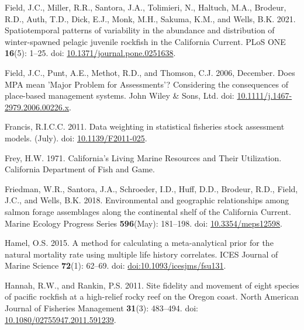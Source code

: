 \documentclass[11pt,
  english,
  a4paper,
]{article}
\newlength{\cslhangindent}
\newenvironment{CSLReferences}[2] %
 {%
  \setlength{\parindent}{0pt}
  \ifodd #1 \everypar{\setlength{\hangindent}{\cslhangindent}}\ignorespaces\fi
  \ifnum #2 > 0
  \setlength{\parskip}{#2\baselineskip}
  \fi
 }%
 {}
\begin{document}
\begin{CSLReferences}{1}{0}
\leavevmode{}%
Field, J.C., Miller, R.R., Santora, J.A., Tolimieri, N., Haltuch, M.A., Brodeur, R.D., Auth, T.D., Dick, E.J., Monk, M.H., Sakuma, K.M., and Wells, B.K. 2021. {Spatiotemporal patterns of variability in the abundance and distribution of winter-spawned pelagic juvenile rockfish in the California Current}. PLoS ONE \textbf{16}(5): 1--25. doi: \href{https://doi.org/10.1371/journal.pone.0251638}{10.1371/journal.pone.0251638}.

\leavevmode{}%
Field, J.C., Punt, A.E., Methot, R.D., and Thomson, C.J. 2006, December. {Does MPA mean 'Major Problem for Assessments'? Considering the consequences of place-based management systems}. John Wiley \& Sons, Ltd. doi: \href{https://doi.org/10.1111/j.1467-2979.2006.00226.x}{10.1111/j.1467-2979.2006.00226.x}.

\leavevmode{}%
Francis, R.I.C.C. 2011. {Data weighting in statistical fisheries stock assessment models}. (July). doi: \href{https://doi.org/10.1139/F2011-025}{10.1139/F2011-025}.

\leavevmode{}%
Frey, H.W. 1971. {California's Living Marine Resources and Their Utilization. California Department of Fish and Game}.

\leavevmode{}%
Friedman, W.R., Santora, J.A., Schroeder, I.D., Huff, D.D., Brodeur, R.D., Field, J.C., and Wells, B.K. 2018. {Environmental and geographic relationships among salmon forage assemblages along the continental shelf of the California Current}. Marine Ecology Progress Series \textbf{596}(May): 181--198. doi: \href{https://doi.org/10.3354/meps12598}{10.3354/meps12598}.

\leavevmode{}%
Hamel, O.S. 2015. {A method for calculating a meta-analytical prior for the natural mortality rate using multiple life history correlates}. ICES Journal of Marine Science \textbf{72}(1): 62--69. doi: \href{https://doi.org/doi:10.1093/icesjms/fsu131}{doi:10.1093/icesjms/fsu131}.

\leavevmode{}%
Hannah, R.W., and Rankin, P.S. 2011. {Site fidelity and movement of eight species of pacific rockfish at a high-relief rocky reef on the Oregon coast}. North American Journal of Fisheries Management \textbf{31}(3): 483--494. doi: \href{https://doi.org/10.1080/02755947.2011.591239}{10.1080/02755947.2011.591239}.


\end{CSLReferences}
\end{document}

